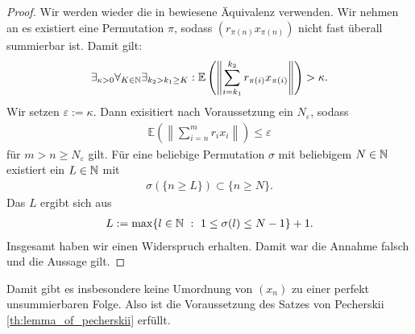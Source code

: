 \begin{proof}
	Wir werden wieder die in \cite{Vakhania:1987} bewiesene Äquivalenz verwenden.
	Wir nehmen an es existiert eine Permutation $ \pi $, sodass $ (r_{\pi(n)} x_{\pi(n)})  $ nicht fast überall summierbar ist.
	Damit gilt:
	\begin{align*}
		\exists_{\kappa > 0}
		\forall_{K \in \mathbb{N}}
		\exists_{k_2 > k_1 \geq K}:
		\mathbb{E}
		\left(
		\left\|
		\sum 
		\limits_{i=k_1}^{k_2} r_{\pi(i)} x_{\pi(i)}
		\right\|
		\right)
		> 
		\kappa.
	\end{align*}
	Wir setzen $ \varepsilon := \kappa $. Dann exisitiert nach Voraussetzung ein $ N_\varepsilon $,
	sodass
	\begin{align*}
		\mathbb{E}
		\left(
		\left\|
		\sum 
		\limits_{i=n}^m r_i x_i
		\right\|
		\right)
		\leq 
		\varepsilon
	\end{align*}
	für $ m > n \geq N_\varepsilon $ gilt.
	Für eine beliebige Permutation $ \sigma $ mit  beliebigem $ N \in \mathbb{N} $ existiert ein $ L \in \mathbb{N} $ mit
	\begin{align*}
		\sigma
		\left( 
		\{
		n \geq L\}
		\right)
		\subset \{n \geq N\}.
	\end{align*}
	Das $ L $ ergibt sich aus
	\begin{align*}
		L := \max \{ l \in \mathbb{N} \ : \ 1 \leq \sigma(l) \leq N-1\} + 1.
	\end{align*} 
	Insgesamt haben wir einen Widerspruch erhalten.	Damit war die Annahme falsch und die Aussage gilt.
\end{proof}
Damit gibt es insbesondere keine Umordnung von $ (x_n) $ zu einer perfekt unsummierbaren Folge. 
Also ist die Voraussetzung des Satzes von Pecherskii \ref{th:lemma_of_pecherskii} erfüllt.
\newpage

